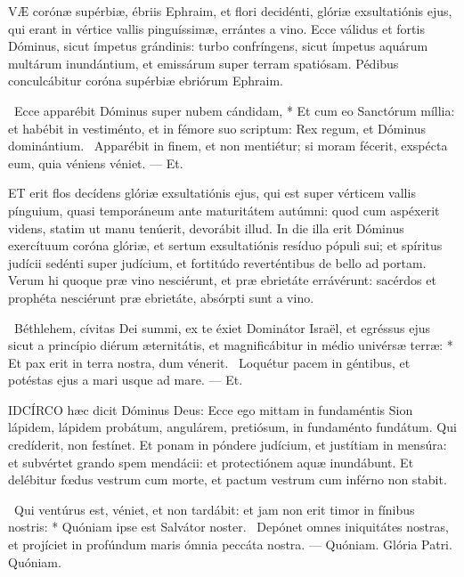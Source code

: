 
\lettrine[lines=2]{V}{Æ} corónæ supérbiæ, ébriis Ephraim, et flori decidénti, glóriæ exsultatiónis ejus, qui erant in vértice vallis pinguíssimæ, errántes a vino. Ecce válidus et fortis Dóminus, sicut ímpetus grándinis: turbo confríngens, sicut ímpetus aquárum multárum inundántium, et emissárum super terram spatiósam. Pédibus conculcábitur coróna supérbiæ ebriórum Ephraim.

\R\ Ecce apparébit Dóminus super nubem cándidam, * Et cum eo Sanctórum míllia: et habébit in vestiménto, et in fémore suo scriptum: Rex regum, et Dóminus dominántium. \V\ Apparébit in finem, et non mentiétur; si moram fécerit, exspécta eum, quia véniens véniet. --- Et.


\lettrine[lines=2]{E}{T} erit flos decídens glóriæ exsultatiónis ejus, qui est super vérticem vallis pínguium, quasi temporáneum ante maturitátem autúmni: quod cum aspéxerit videns, statim ut manu tenúerit, devorábit illud. In die illa erit Dóminus exercítuum coróna glóriæ, et sertum exsultatiónis resíduo pópuli sui; et spíritus judícii sedénti super judícium, et fortitúdo reverténtibus de bello ad portam. Verum hi quoque præ vino nesciérunt, et præ ebrietáte errávérunt: sacérdos et prophéta nesciérunt præ ebrietáte, absórpti sunt a vino.

\R\ Béthlehem, cívitas Dei summi, ex te éxiet Dominátor Israël, et egréssus ejus sicut a princípio diérum æternitátis, et magnificábitur in médio univérsæ terræ: * Et pax erit in terra nostra, dum vénerit. \V\ Loquétur pacem in géntibus, et potéstas ejus a mari usque ad mare. --- Et.


\lettrine[lines=2]{I}{DCÍRCO} hæc dicit Dóminus Deus: Ecce ego mittam in fundaméntis Sion lápidem, lápidem probátum, angulárem, pretiósum, in fundaménto fundátum. Qui credíderit, non festínet. Et ponam in póndere judícium, et justítiam in mensúra: et subvértet grando spem mendácii: et protectiónem aquæ inundábunt. Et delébitur fœdus vestrum cum morte, et pactum vestrum cum inférno non stabit.

\R\ Qui ventúrus est, véniet, et non tardábit: et jam non erit timor in fínibus nostris: * Quóniam ipse est Salvátor noster. \V\ Depónet omnes iniquitátes nostras, et projíciet in profúndum maris ómnia peccáta nostra. --- Quóniam. Glória Patri. Quóniam.

